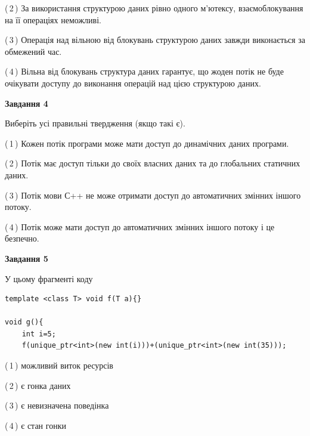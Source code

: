 \documentclass[12pt, ukrainian]{article}
\begin{document}
\begin {large}
{(\,2\,) За використання структурою даних рівно одного м’ютексу, взаємоблокування на її операціях неможливі.%

(\,3\,) Операція над вільною від блокувань структурою даних завжди виконається за обмежений час.%

(\,4\,) Вільна від блокувань структура даних гарантує, що жоден потік не буде очікувати доступу до виконання операцій над цією структурою даних.%



\begin{center}
\textbf{Завдання 4}
\end{center}
Виберіть усі правильні твердження (якщо такі є).\par
\vspace{2mm}

(\,1\,) Кожен потік програми може мати доступ до динамічних даних програми.%

(\,2\,) Потік має доступ тільки до своїх власних даних та до глобальних статичних даних.%

(\,3\,) Потік мови С++ не може отримати доступ до автоматичних змінних іншого потоку.%

(\,4\,) Потік може мати доступ до автоматичних змінних іншого потоку і це безпечно.%



\begin{center}
\textbf{Завдання 5}
\end{center}
У цьому фрагменті коду
\begin{verbatim}
template <class T> void f(T a){}

void g(){
    int i=5;
    f(unique_ptr<int>(new int(i)))+(unique_ptr<int>(new int(35)));
\end{verbatim}
(\,1\,) можливий виток ресурсів%

(\,2\,) є гонка даних%

(\,3\,) є невизначена поведінка%

(\,4\,) є стан гонки%


}
\end {large}
\end{document}
